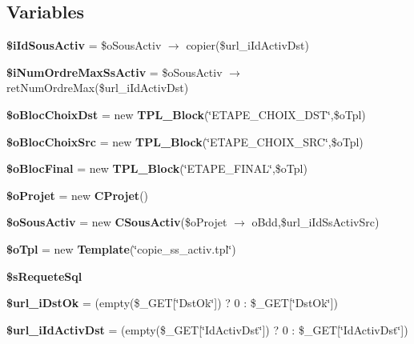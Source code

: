 \subsection*{Variables}
\begin{CompactItemize}
\item 
\textbf{\$iIdSousActiv} = \$oSousActiv $\rightarrow$ copier(\$url\_\-iIdActivDst)\label{copie__ss__activ_8php_4c81e976126f6f7c67298f737e074b21}

\item 
\textbf{\$iNumOrdreMaxSsActiv} = \$oSousActiv $\rightarrow$ retNumOrdreMax(\$url\_\-iIdActivDst)\label{copie__ss__activ_8php_ca19345a0832986bf52fce359dc1d32a}

\item 
\textbf{\$oBlocChoixDst} = new {\bf TPL\_\-Block}(\char`\"{}ETAPE\_\-CHOIX\_\-DST\char`\"{},\$oTpl)\label{copie__ss__activ_8php_a0f1cd44252709be7ca4d43a533220de}

\item 
\textbf{\$oBlocChoixSrc} = new {\bf TPL\_\-Block}(\char`\"{}ETAPE\_\-CHOIX\_\-SRC\char`\"{},\$oTpl)\label{copie__ss__activ_8php_4cecff766c78bea7967c9c00a8fde40d}

\item 
\textbf{\$oBlocFinal} = new {\bf TPL\_\-Block}(\char`\"{}ETAPE\_\-FINAL\char`\"{},\$oTpl)\label{copie__ss__activ_8php_0404b3d41507482ec262c7e0605fab5e}

\item 
\textbf{\$oProjet} = new {\bf CProjet}()\label{copie__ss__activ_8php_ec412e7ac901485e72b77d2185159421}

\item 
\textbf{\$oSousActiv} = new {\bf CSousActiv}(\$oProjet $\rightarrow$ oBdd,\$url\_\-iIdSsActivSrc)\label{copie__ss__activ_8php_d04d9217757b17c226f60c1bb3ac5071}

\item 
\textbf{\$oTpl} = new {\bf Template}(\char`\"{}copie\_\-ss\_\-activ.tpl\char`\"{})\label{copie__ss__activ_8php_7de57ba665b7c068e98ea46469be2865}

\item 
\textbf{\$sRequeteSql}
\item 
\textbf{\$url\_\-iDstOk} = (empty(\$\_\-GET[\char`\"{}DstOk\char`\"{}]) ? 0 : \$\_\-GET[\char`\"{}DstOk\char`\"{}])\label{copie__ss__activ_8php_42d909467c92be850ded5265fb08476f}

\item 
\textbf{\$url\_\-iIdActivDst} = (empty(\$\_\-GET[\char`\"{}IdActivDst\char`\"{}]) ? 0 : \$\_\-GET[\char`\"{}IdActivDst\char`\"{}])\label{copie__ss__activ_8php_e9e9a3395f0914014995357e905d6c27}


\end{CompactItemize}
